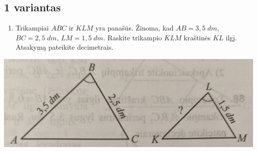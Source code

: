 \documentclass[a4paper]{article}
\begin{document}
\subsection*{1 variantas}

\begin{minipage}{0.5\textwidth}
      \begin{enumerate}
            \setcounter{enumi}{0} %
            \item Trikampiai $ABC$ ir $KLM$ yra panašūs. Žinoma, kad $AB=3,5 \; dm$, $BC=2,5 \;
                        dm$, $LM=1,5 \; dm$. Raskite trikampio $KLM$ kraštinės $KL$ ilgį. Atsakymą
                  pateikite decimetrais.
      \end{enumerate}

      \begin{center}
            \includegraphics[scale=0.45]{images/triangle_1.png}
      \end{center}

\end{minipage}
\end{document}
